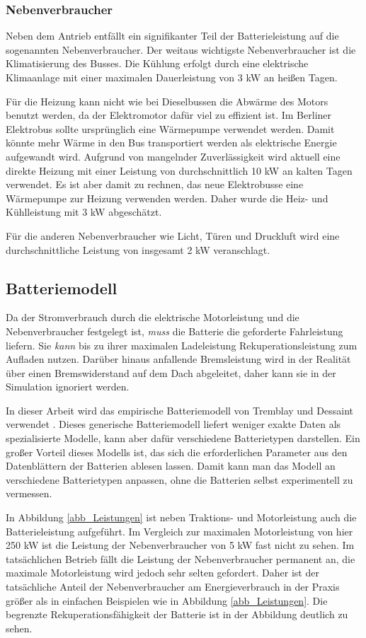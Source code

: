 \subsubsection{Nebenverbraucher}
Neben dem Antrieb entfällt ein signifikanter Teil der Batterieleistung auf die sogenannten Nebenverbraucher. Der weitaus wichtigste Nebenverbraucher ist die Klimatisierung des Busses. Die Kühlung erfolgt durch eine elektrische Klimaanlage mit einer maximalen Dauerleistung von 3 kW an heißen Tagen.

Für die Heizung kann nicht wie bei Dieselbussen die Abwärme des Motors benutzt werden, da der Elektromotor dafür viel zu effizient ist. Im Berliner Elektrobus sollte ursprünglich eine Wärmepumpe verwendet werden. Damit könnte mehr Wärme in den Bus transportiert werden als elektrische Energie aufgewandt wird. Aufgrund von mangelnder Zuverlässigkeit wird aktuell eine direkte Heizung mit einer Leistung von durchschnittlich 10 kW an kalten Tagen verwendet. Es ist aber damit zu rechnen, das neue Elektrobusse eine Wärmepumpe zur Heizung verwenden werden. Daher wurde die Heiz- und Kühlleistung mit 3 kW abgeschätzt.

Für die anderen Nebenverbraucher wie Licht, Türen und Druckluft wird eine durchschnittliche Leistung von insgesamt 2 kW veranschlagt.

\subsection{Batteriemodell}
Da der Stromverbrauch durch die elektrische Motorleistung und die Nebenverbraucher festgelegt ist, \emph{muss} die Batterie die geforderte Fahrleistung liefern. Sie \emph{kann} bis zu ihrer maximalen Ladeleistung Rekuperationsleistung zum Aufladen nutzen. Darüber hinaus anfallende Bremsleistung wird in der Realität über einen Bremswiderstand auf dem Dach abgeleitet, daher kann sie in der Simulation ignoriert werden.

In dieser Arbeit wird das empirische Batteriemodell von Tremblay und Dessaint verwendet \cite{tremblay2009experimental}. Dieses generische Batteriemodell liefert weniger exakte Daten als spezialisierte Modelle, kann aber dafür verschiedene Batterietypen darstellen. Ein großer Vorteil dieses Modells ist, das sich die erforderlichen Parameter aus den Datenblättern der Batterien ablesen lassen. Damit kann man das Modell an verschiedene Batterietypen anpassen, ohne die Batterien selbst experimentell zu vermessen.

In Abbildung \ref{abb_Leistungen} ist neben Traktions- und Motorleistung auch die Batterieleistung aufgeführt. Im Vergleich zur maximalen Motorleistung von hier 250 kW ist die Leistung der Nebenverbraucher von 5 kW fast nicht zu sehen. Im tatsächlichen Betrieb fällt die Leistung der Nebenverbraucher permanent an, die maximale Motorleistung wird jedoch sehr selten gefordert. Daher ist der tatsächliche Anteil der Nebenverbraucher am Energieverbrauch in der Praxis größer als in einfachen Beispielen wie in Abbildung \ref{abb_Leistungen}. Die begrenzte Rekuperationsfähigkeit der Batterie ist in der Abbildung deutlich zu sehen.

